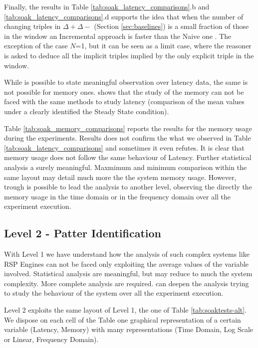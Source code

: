 Finally, the results in Table \ref{tab:soak_latency_comparisons}.b and \ref{tab:soak_latency_comparisons}.d supports the idea that when the number of changing triples in $\Delta+ \Delta-$ (Section \ref{sec:baselines}) is a small fraction of those in the window an Incremental approach is faster than the Naive one \cite{DellAglio2014,DBLP:conf/cikm/RenP11,DBLP:conf/semweb/UrbaniMJHB13}. The exception of the case $N$=1, but it can be seen as a limit case, where the reasoner is asked to deduce all the implicit triples implied by the only explicit triple in the window.  

While is possible to state meaningful observation over latency data, the same is not possible for memory ones. \name shows that the study of the memory can not be faced with the same methods to study latency (comparison of the mean values under a clearly identified the Steady State condition). 

Table \ref{tab:soak_memory_comparisons} reports the  results for the memory usage during the experiments. Results does not confirm the what we observed in Table \ref{tab:soak_latency_comparisons} and sometimes it even refutes. It is clear that memory usage does not follow the same behaviour of Latency.
Further statistical analysis a surely meaningful. Maxmimum and minimum comparison within the same layout may detail much more the the system memory usage. However, trough \name is possible to lead the analysis to another level, observing the directly the memory usage in the time domain or in the frequency domain over all the experiment execution. 

\subsection{Level 2 - Patter Identification}

With Level 1 we have understand how the analysis of such complex systems like RSP Engines can not be faced only exploiting the average values of the variable involved. Statistical analysis are meaningful, but may reduce to much the system complexity. More complete analysis are required. \name can deepen the analysis trying to study the behaviour of the system over all the experiment execution.

Level 2 exploits the same layout of Level 1, the one of Table \ref{tab:soaktests-alt}. We dispose on each cell of the Table  one graphical representation of a certain variable (Latency, Memory) with many representations (Time Domain, Log Scale or Linear, Frequency Domain).


